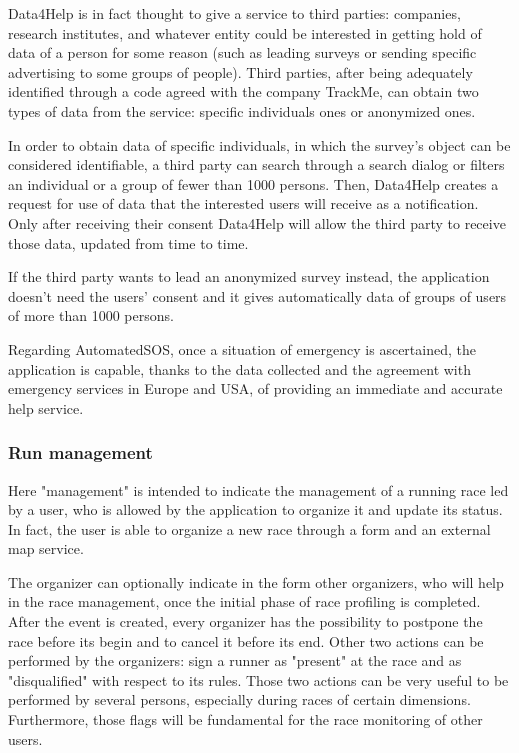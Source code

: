 Data4Help is in fact thought to give a service to third parties: companies, research institutes, and whatever entity could be interested in getting hold of data of a person for some reason (such as leading surveys or sending specific advertising to some groups of people). Third parties, after being adequately identified through a code agreed with the company TrackMe, can obtain two types of data from the service: specific individuals ones or anonymized ones.

In order to obtain data of specific individuals, in which the survey's object can be considered identifiable, a third party can search through a search dialog or filters an individual or a group of fewer than 1000 persons. Then, Data4Help creates a request for use of data that the interested users will receive as a notification. Only after receiving their consent Data4Help will allow the third party to receive those data, updated from time to time.

If the third party wants to lead an anonymized survey instead, the application doesn't need the users' consent and it gives automatically data of groups of users of more than 1000 persons.

Regarding AutomatedSOS, once a situation of emergency is ascertained, the application is capable, thanks to the data collected and the agreement with emergency services in Europe and USA, of providing an immediate and accurate help service. 

\subsubsection{Run management} 
Here "management" is intended to indicate the management of a running race led by a user, who is allowed by the application to organize it and update its status. In fact, the user is able to organize a new race through a form and an external map service.

The organizer can optionally indicate in the form other organizers, who will help in the race management, once the initial phase of race profiling is completed. After the event is created, every organizer has the possibility to postpone the race before its begin and to cancel it before its end. Other two actions can be performed by the organizers: sign a runner as "present" at the race and as "disqualified" with respect to its rules. Those two actions can be very useful to be performed by several persons, especially during races of certain dimensions. Furthermore, those flags will be fundamental for the race monitoring of other users.


